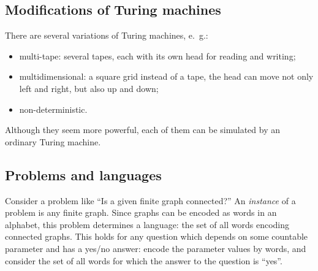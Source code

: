 \subsection{Modifications of Turing machines}
There are several variations of Turing machines, e.~g.:
\begin{itemize}
\item
multi-tape: several tapes, each with its own head for reading and writing;
\item
multidimensional: a square grid instead of a tape, the head can move not only left and right, but also up and down;
\item
non-deterministic.
\end{itemize}
Although they seem more powerful, each of them can be simulated by an ordinary Turing machine.



\subsection{Problems and languages}
Consider a problem like ``Is a given finite graph connected?''
An \emph{instance} of a problem is any finite graph.
Since graphs can be encoded as words in an alphabet, this problem determines a language:
the set of all words encoding connected graphs.
This holds for any question which depends on some countable parameter and has a yes/no answer:
encode the parameter values by words, and consider the set of all words for which the answer to the question is ``yes''.
